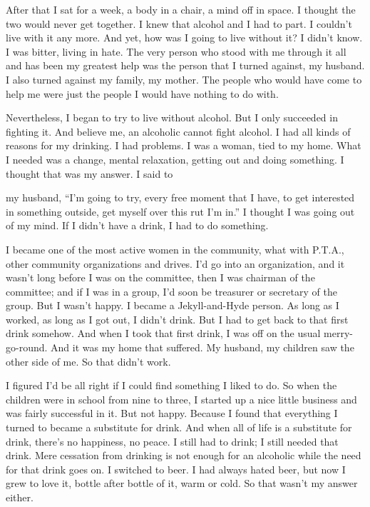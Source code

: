 After that I sat for a week, a body in a chair, a mind off in space. I thought the two would never get together. I knew that alcohol and I had to part. I couldn’t live with it any more. And yet, how was I going to live without it? I didn’t know. I was bitter, living in hate. The very person who stood with me through it all and has been my greatest help was the person that I turned against, my husband. I also turned against my family, my mother. The people who would have come to help me were just the people I would have nothing to do with.

Nevertheless, I began to try to live without alcohol. But I only succeeded in fighting it. And believe me, an alcoholic cannot fight alcohol. I had all kinds of reasons for my drinking. I had problems. I was a woman, tied to my home. What I needed was a change, mental relaxation, getting out and doing something. I thought that was my answer. I said to

my husband, “I’m going to try, every free moment that I have, to get interested in something outside, get myself over this rut I’m in.” I thought I was going out of my mind. If I didn’t have a drink, I had to do something.

I became one of the most active women in the community, what with P.T.A., other community organizations and drives. I’d go into an organization, and it wasn’t long before I was on the committee, then I was chairman of the committee; and if I was in a group, I’d soon be treasurer or secretary of the group. But I wasn’t happy. I became a Jekyll-and-Hyde person. As long as I worked, as long as I got out, I didn’t drink. But I had to get back to that first drink somehow. And when I took that first drink, I was off on the usual merry-go-round. And it was my home that suffered. My husband, my children saw the other side of me. So that didn’t work.

I figured I’d be all right if I could find something I liked to do. So when the children were in school from nine to three, I started up a nice little business and was fairly successful in it. But not happy. Because I found that everything I turned to became a substitute for drink. And when all of life is a substitute for drink, there’s no happiness, no peace. I still had to drink; I still needed that drink. Mere cessation from drinking is not enough for an alcoholic while the need for that drink goes on. I switched to beer. I had always hated beer, but now I grew to love it, bottle after bottle of it, warm or cold. So that wasn’t my answer either.

